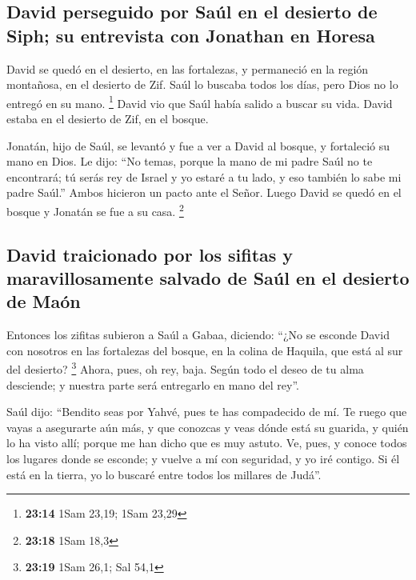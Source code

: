 \begin{paracol}{2}
\hypertarget{david-perseguido-por-sauxfal-en-el-desierto-de-siph-su-entrevista-con-jonathan-en-horesa}{%
\subsection{David perseguido por Saúl en el desierto de Siph; su
entrevista con Jonathan en
Horesa}\label{david-perseguido-por-sauxfal-en-el-desierto-de-siph-su-entrevista-con-jonathan-en-horesa}}

 David se quedó en el desierto, en las fortalezas, y
permaneció en la región montañosa, en el desierto de Zif. Saúl lo
buscaba todos los días, pero Dios no lo entregó en su mano. \footnote{\textbf{23:14}
  1Sam 23,19; 1Sam 23,29}  David vio que Saúl había
salido a buscar su vida. David estaba en el desierto de Zif, en el
bosque.

 Jonatán, hijo de Saúl, se levantó y fue a ver a David al
bosque, y fortaleció su mano en Dios.  Le dijo: ``No
temas, porque la mano de mi padre Saúl no te encontrará; tú serás rey de
Israel y yo estaré a tu lado, y eso también lo sabe mi padre Saúl.''
 Ambos hicieron un pacto ante el Señor. Luego David se
quedó en el bosque y Jonatán se fue a su casa. \footnote{\textbf{23:18}
  1Sam 18,3}

\hypertarget{david-traicionado-por-los-sifitas-y-maravillosamente-salvado-de-sauxfal-en-el-desierto-de-mauxf3n}{%
\subsection{David traicionado por los sifitas y maravillosamente salvado
de Saúl en el desierto de
Maón}\label{david-traicionado-por-los-sifitas-y-maravillosamente-salvado-de-sauxfal-en-el-desierto-de-mauxf3n}}

 Entonces los zifitas subieron a Saúl a Gabaa, diciendo:
``¿No se esconde David con nosotros en las fortalezas del bosque, en la
colina de Haquila, que está al sur del desierto? \footnote{\textbf{23:19}
  1Sam 26,1; Sal 54,1}  Ahora, pues, oh rey, baja. Según
todo el deseo de tu alma desciende; y nuestra parte será entregarlo en
mano del rey''.

 Saúl dijo: ``Bendito seas por Yahvé, pues te has
compadecido de mí.  Te ruego que vayas a asegurarte aún
más, y que conozcas y veas dónde está su guarida, y quién lo ha visto
allí; porque me han dicho que es muy astuto.  Ve, pues, y
conoce todos los lugares donde se esconde; y vuelve a mí con seguridad,
y yo iré contigo. Si él está en la tierra, yo lo buscaré entre todos los
millares de Judá''.


\end{paracol}
